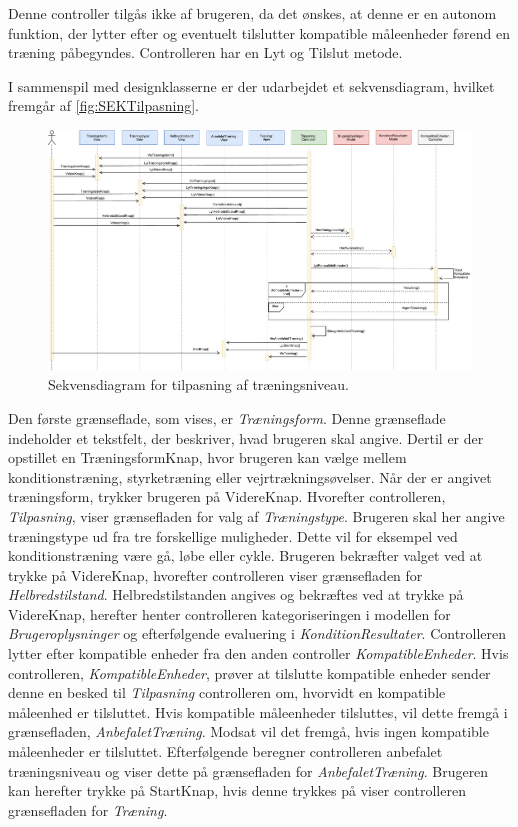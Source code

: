\noindent 
Denne controller tilgås ikke af brugeren, da det ønskes, at denne er en autonom funktion, der lytter efter og eventuelt tilslutter kompatible måleenheder førend en træning påbegyndes. Controlleren har en Lyt og Tilslut metode. 

I sammenspil med designklasserne er der udarbejdet et sekvensdiagram, hvilket fremgår af \autoref{fig:SEKTilpasning}. 

\begin{figure} [H]
\centering
\includegraphics[width=1.55\textwidth, angle=90]{figures/Sek/SEKTilpasning}
\caption{Sekvensdiagram for tilpasning af træningsniveau.}
\label{fig:SEKTilpasning}
\end{figure}

\noindent
Den første grænseflade, som vises, er \textit{Træningsform}. Denne grænseflade indeholder et tekstfelt, der beskriver, hvad brugeren skal angive. Dertil er der opstillet en TræningsformKnap, hvor brugeren kan vælge mellem konditionstræning, styrketræning eller vejrtrækningsøvelser. Når der er angivet træningsform, trykker brugeren på VidereKnap. Hvorefter controlleren, \textit{Tilpasning}, viser grænsefladen for valg af \textit{Træningstype}. Brugeren skal her angive træningstype ud fra tre forskellige muligheder. Dette vil for eksempel ved konditionstræning være gå, løbe eller cykle. Brugeren bekræfter valget ved at trykke på VidereKnap, hvorefter controlleren viser grænsefladen for \textit{Helbredstilstand}. Helbredstilstanden angives og bekræftes ved at trykke på VidereKnap, herefter henter controlleren kategoriseringen i modellen for \textit{Brugeroplysninger} og efterfølgende evaluering i \textit{KonditionResultater}.
Controlleren lytter efter kompatible enheder fra den anden controller \textit{KompatibleEnheder}. Hvis controlleren, \textit{KompatibleEnheder}, prøver at tilslutte kompatible enheder sender denne en besked til \textit{Tilpasning} controlleren om, hvorvidt en kompatible måleenhed er tilsluttet. Hvis kompatible måleenheder tilsluttes, vil dette fremgå i grænsefladen, \textit{AnbefaletTræning}. Modsat vil det fremgå, hvis ingen kompatible måleenheder er tilsluttet. 
Efterfølgende beregner controlleren anbefalet træningsniveau og viser dette på grænsefladen for \textit{AnbefaletTræning}. Brugeren kan herefter trykke på StartKnap, hvis denne trykkes på viser controlleren grænsefladen for \textit{Træning}. 
